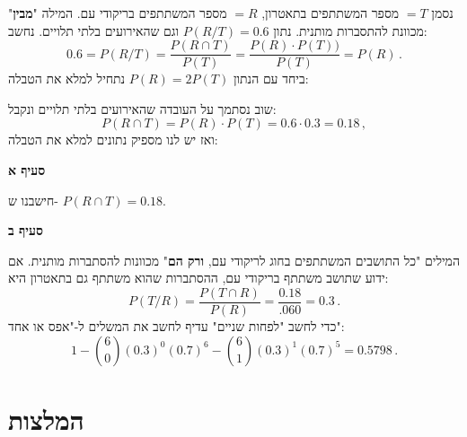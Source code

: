 נסמן
$=T$
מספר המשתתפים בתאטרון,
$=R$
מספר המשתתפים בריקודי עם. המילה 
"\textbf{מבין}"
מכוונת להתסברות מותנית. נתון
$P(R/T)=0.6$
וגם שהאירועים בלתי תלויים. נחשב:
\[
0.6=P(R/T)=\frac{P(R\cap T)}{P(T)}=\frac{P(R)\cdot P(T))}{P(T)}=P(R)\,.
\]
ביחד עם הנתון
$P(R)=2P(T)$
נתחיל למלא את הטבלה:
\begin{center}
\end{center}
שוב נסתמך על העובדה שהאירועים בלתי תלויים ונקבל:
\[
P(R\cap T)=P(R)\cdot P(T)=0.6\cdot 0.3=0.18\,,
\]
ואז יש לנו מספיק נתונים למלא את הטבלה:
\begin{center}
\end{center}
\textbf{סעיף א}

חישבנו ש-%
$P(R\cap T)=0.18$.

\textbf{סעיף ב}

המילים "כל התושבים המשתתפים בחוג לריקודי עם,
\textbf{ורק הם}"
מכוונות להסתברות מותנית. אם ידוע שתושב משתתף בריקודי עם, ההסתברות שהוא משתתף גם בתאטרון היא:
\[
P(T/R) = \frac{P(T\cap R)}{P(R)}= \frac{0.18}{.060} = 0.3\,.
\]
כדי לחשב "לפחות שניים" עדיף לחשב את המשלים ל-"אפס או אחד":
\[
1-{6\choose 0}(0.3)^0(0.7)^6 -{6\choose 1}(0.3)^1(0.7)^5=0.5798\,.
\]


\np
\section{המלצות}

